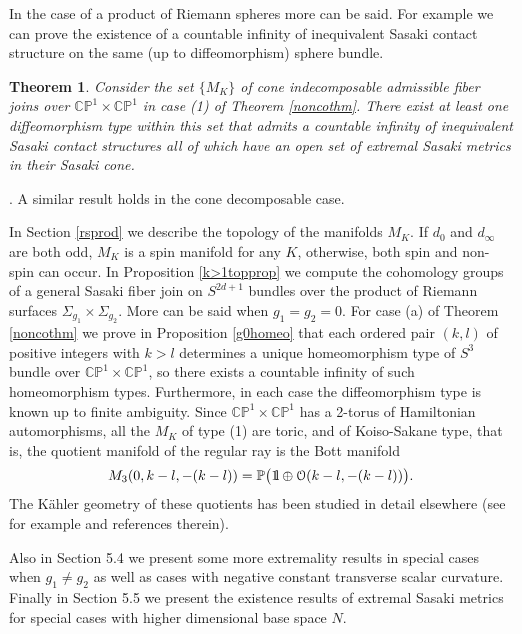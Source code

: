 \documentclass[12pt]{amsart}
\newtheorem{theorem}{Theorem}[section]
\newenvironment{remark}{\medskip \refstepcounter{theorem}
\noindent  {\bf Remark \thetheorem}.\rm}{\,}
\renewcommand{\thetheorem}{\thesection.\arabic{theorem}}
\def\BOne{{\mathchoice {\rm 1\mskip-4mu l} {\rm 1\mskip-4mu l}
                          {\rm 1\mskip-4.5mu l} {\rm 1\mskip-5mu l}}}
\def\bbc{{\mathbb C}}
\def\bbp{{\mathbb P}}
\def\grS{\Sigma}
\def\calo{{\mathcal O}}
\def\calo{{\mathcal O}}
\begin{document}
In the case of a product of Riemann spheres more can be said. For example we can prove the existence of a countable infinity of inequivalent Sasaki contact structure on the same (up to diffeomorphism)  sphere bundle.

\begin{theorem}\label{gen0prodcor}
Consider the set $\{M_K\}$ of cone indecomposable admissible fiber joins over $\bbc\bbp^1\times \bbc\bbp^1$ in case (1) of Theorem \ref{noncothm}. There exist at least one diffeomorphism type within this set that admits a countable infinity of  inequivalent Sasaki contact structures all of which have an open set of extremal Sasaki metrics in their Sasaki cone.
\end{theorem}

\begin{remark} A similar result holds in the cone decomposable case.
\end{remark}

In Section \ref{rsprod} we describe the topology of the manifolds $M_K$. If $d_0$ and $d_\infty$ are both odd, $M_K$ is a spin manifold for any $K$, otherwise, both spin and non-spin can occur. In Proposition \ref{k>1topprop} we compute the cohomology groups of a general Sasaki fiber join on $S^{2d+1}$ bundles over the product of Riemann surfaces $\grS_{g_1}\times \grS_{g_2}$. More can be said when $g_1=g_2=0$. For case (a) of Theorem \ref{noncothm} we prove in Proposition \ref{g0homeo} that each ordered pair $(k,l)$ of positive integers with $k>l$ determines a unique homeomorphism type of $S^3$ bundle over $\bbc\bbp^1\times \bbc\bbp^1$, so there exists a countable infinity of such homeomorphism types. Furthermore, in each case the diffeomorphism type is known up to finite ambiguity.
Since $\bbc\bbp^1\times \bbc\bbp^1$ has a 2-torus of Hamiltonian automorphisms, all the $M_K$ of type (1) are toric, and of Koiso-Sakane type, that is, the quotient manifold of the regular ray is the Bott manifold $$M_3(0,k-l,-(k-l))= \bbp\bigl(\BOne\oplus \calo(k-l,-(k-l))\bigr).$$ 
The K\"ahler geometry of these quotients has been studied in detail elsewhere (see for example \cite{BoCaTo17} and references therein).  

Also in Section 5.4 we present some more extremality results in special cases when $g_1\neq g_2$ as well as cases with negative constant transverse scalar curvature. Finally in Section 5.5 we present the existence results of extremal Sasaki metrics for special cases with higher dimensional base space $N$.
\end{document}
